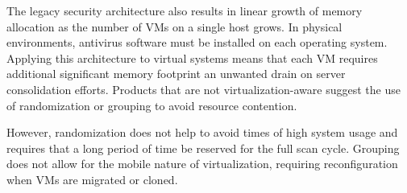 The legacy security architecture also results in linear growth of memory allocation as the number of VMs on a single host grows. In physical environments, antivirus software must be installed on each operating system. Applying this architecture to virtual systems means that each VM requires additional significant memory footprint  an unwanted drain on server consolidation efforts.
Products that are not virtualization-aware suggest the use of randomization or grouping to avoid resource contention.

However, randomization does not help to avoid times of high system usage and requires that a long period of time be reserved for the full scan cycle. Grouping does not allow for the mobile nature of virtualization, requiring reconfiguration when VMs are migrated or cloned.



